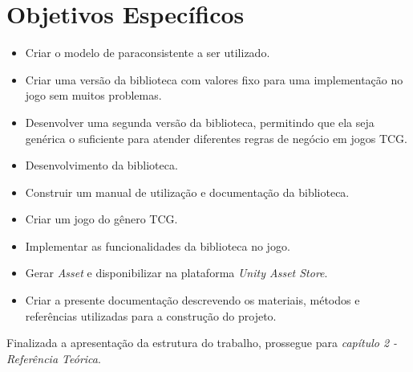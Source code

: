 \section{Objetivos Específicos}
	\begin{itemize}
		\item Criar o modelo de paraconsistente a ser utilizado.
		\item Criar uma versão da biblioteca com valores fixo para uma implementação no jogo sem muitos problemas.
		\item Desenvolver uma segunda versão da biblioteca, permitindo que ela seja genérica o suficiente para atender diferentes regras de negócio em jogos TCG.
		\item Desenvolvimento da biblioteca.
		\item Construir um manual de utilização e documentação da biblioteca.
		\item Criar um jogo do gênero TCG.
		\item Implementar as funcionalidades da biblioteca no jogo.
		\item Gerar \textit{Asset} e disponibilizar na plataforma \textit{Unity Asset Store}.
		\item Criar a presente documentação descrevendo os materiais, métodos e referências utilizadas para a construção do projeto.
	\end{itemize}

	
Finalizada a apresentação da estrutura do trabalho, prossegue para \textit{capítulo 2 - Referência Teórica}.
